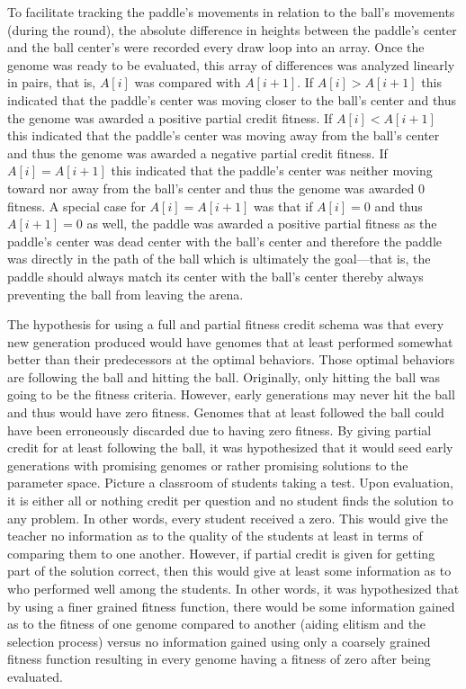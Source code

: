 \documentclass[a4paper,10pt]{article}
\begin{document}
To facilitate tracking the paddle's movements in relation to the ball's movements (during the round), the absolute difference in heights between the paddle's center and the ball center's were recorded every draw loop into an array. Once the genome was ready to be evaluated, this array of differences was analyzed linearly in pairs, that is, $A[i]$ was compared with $A[i+1]$. If $A[i]>A[i+1]$ this indicated that the paddle's center was moving closer to the ball's center and thus the genome was awarded a positive partial credit fitness. If $A[i]<A[i+1]$ this indicated that the paddle's center was moving away from the ball's center and thus the genome was awarded a negative partial credit fitness. If $A[i]=A[i+1]$ this indicated that the paddle's center was neither moving toward nor away from the ball's center and thus the genome was awarded $0$ fitness. A special case for $A[i]=A[i+1]$ was that if $A[i]=0$ and thus $A[i+1]=0$ as well, the paddle was awarded a positive partial fitness as the paddle's center was dead center with the ball's center and therefore the paddle was directly in the path of the ball which is ultimately the goal---that is, the paddle should always match its center with the ball's center thereby always preventing the ball from leaving the arena.

The hypothesis for using a full and partial fitness credit schema was that every new generation produced would have genomes that at least performed somewhat better than their predecessors at the optimal behaviors. Those optimal behaviors are following the ball and hitting the ball. Originally, only hitting the ball was going to be the fitness criteria. However, early generations may never hit the ball and thus would have zero fitness. Genomes that at least followed the ball could have been erroneously discarded due to having zero fitness. By giving partial credit for at least following the ball, it was hypothesized that it would seed early generations with promising genomes or rather promising solutions to the parameter space. Picture a classroom of students taking a test. Upon evaluation, it is either all or nothing credit per question and no student finds the solution to any problem. In other words, every student received a zero. This would give the teacher no information as to the quality of the students at least in terms of comparing them to one another. However, if partial credit is given for getting part of the solution correct, then this would give at least some information as to who performed well among the students. In other words, it was hypothesized that by using a finer grained fitness function, there would be some information gained as to the fitness of one genome compared to another (aiding elitism and the selection process) versus no information gained using only a coarsely grained fitness function resulting in every genome having a fitness of zero after being evaluated.
\end{document}
